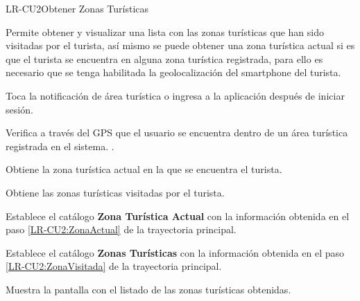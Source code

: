 
% 



	\begin{UseCase}{LR-CU2}{Obtener Zonas Turísticas}{
		
		Permite obtener y visualizar una lista con las zonas turísticas que han sido visitadas por el turista, así mismo se puede obtener una zona turística actual si es que el turista se encuentra en alguna zona turística registrada, para ello es necesario que se tenga habilitada la geolocalización del smartphone del turista. 	
	}
	\end{UseCase}
	\begin{UCtrayectoria} 
		\UCpaso [\UCactor] Toca la notificación de área turística o ingresa a la aplicación después de iniciar sesión.
		
		
		\UCpaso Verifica a través del GPS que el usuario se encuentra dentro de un área turística registrada en el sistema. .
		
		\UCpaso \label{LR-CU2:ZonaActual} Obtiene la zona turística actual en la que se encuentra el turista.
		
		\UCpaso \label{LR-CU2:ZonaVisitada} Obtiene las zonas turísticas visitadas por el turista.
		
		\UCpaso Establece el catálogo \textbf{Zona Turística Actual} con la información obtenida en el paso \ref{LR-CU2:ZonaActual} de la trayectoria principal.
		
		\UCpaso Establece el catálogo \textbf{Zonas Turísticas} con la información obtenida en el paso \ref{LR-CU2:ZonaVisitada} de la trayectoria principal.
		
		\UCpaso \label{LR-CU2:Pantalla} Muestra la pantalla  con el listado de las zonas turísticas obtenidas.
		
	\end{UCtrayectoria}


